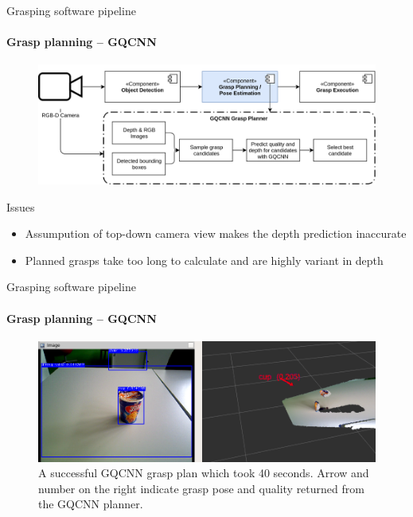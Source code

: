 \documentclass{beamer}
\begin{document}
\begin{frame}{Grasping software pipeline}
    \framesubtitle{Grasp planning -- GQCNN}
    \begin{figure}[b]
        \centering
        \includegraphics[width=0.8\linewidth]{grasp_pipeline_gqcnn}
    \end{figure}
\begin{exampleblock}{Issues}
    \begin{itemize}
        \item Assumpution of top-down camera view makes the depth prediction inaccurate
        \item Planned grasps take too long to calculate and are highly variant in depth
    \end{itemize}
\end{exampleblock}
\end{frame}

\begin{frame}{Grasping software pipeline}
\framesubtitle{Grasp planning -- GQCNN}%
    \begin{figure}[b]
    \centering
    \includegraphics[width=0.9\linewidth]{grasp_gqcnn_result}
    \caption{\small A successful GQCNN grasp plan which took 40 seconds. Arrow and number on the right indicate grasp
        pose and quality returned from the GQCNN planner.}
    \label{fig:gqcnn_result}
    \end{figure}
\end{frame}
\end{document}
